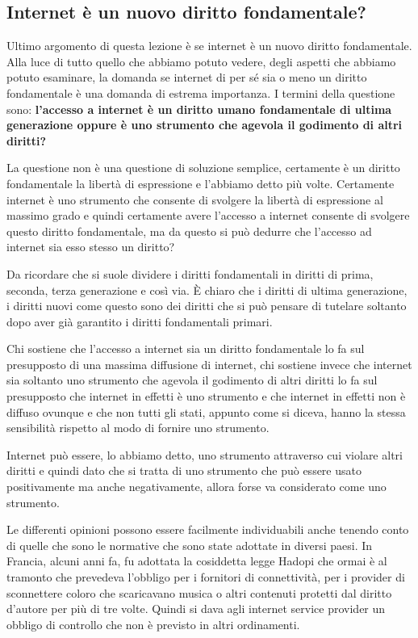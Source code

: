 \subsection{Internet è un nuovo diritto fondamentale?}
Ultimo argomento di questa lezione è se internet è un nuovo diritto fondamentale. Alla luce di tutto quello che abbiamo potuto vedere, degli aspetti che abbiamo potuto esaminare, la domanda se internet di per sé sia o meno un diritto fondamentale è una domanda di estrema importanza. I termini della questione sono: \textbf{l'accesso a internet è un diritto umano fondamentale di ultima generazione oppure è uno strumento che agevola il godimento di altri diritti?}\par
La questione non è una questione di soluzione semplice, certamente è un diritto fondamentale la libertà di espressione e l'abbiamo detto più volte. Certamente internet è uno strumento che consente di svolgere la libertà di espressione al massimo grado e quindi certamente avere l'accesso a internet consente di svolgere questo diritto fondamentale, ma da questo si può dedurre che l'accesso ad internet sia esso stesso un diritto? \par
Da ricordare che si suole dividere i diritti fondamentali in diritti di prima, seconda, terza generazione e così via. È chiaro che i diritti di ultima generazione, i diritti nuovi come questo sono dei diritti che si può pensare di tutelare soltanto dopo aver già garantito i diritti fondamentali primari.\par
Chi sostiene che l'accesso a internet sia un diritto fondamentale lo fa sul presupposto di una massima diffusione di internet, chi sostiene invece che internet sia soltanto uno strumento che agevola il godimento di altri diritti lo fa sul presupposto che internet in effetti è uno strumento e che internet in effetti non è diffuso ovunque e che non tutti gli stati, appunto come si diceva, hanno la stessa sensibilità rispetto al modo di fornire uno strumento. \par
Internet può essere, lo abbiamo detto, uno strumento attraverso cui violare altri diritti e quindi dato che si tratta di uno strumento che può essere usato positivamente ma anche negativamente, allora forse va considerato come uno strumento.\par
Le differenti opinioni possono essere facilmente individuabili anche tenendo conto di quelle che sono le normative che sono state adottate in diversi paesi. In Francia, alcuni anni fa, fu adottata la cosiddetta legge Hadopi che ormai è al tramonto che prevedeva l'obbligo per i fornitori di connettività, per i provider di sconnettere coloro che scaricavano musica o altri contenuti protetti dal diritto d'autore per più di tre volte. Quindi si dava agli internet service provider un obbligo di controllo che non è previsto in altri ordinamenti. \par

